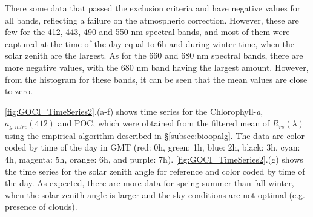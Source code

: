 \documentclass[onecolumn,3p,letterpaper,11pt]{elsarticle}
\begin{document}
There some data that passed the exclusion criteria and have negative values for all bands, reflecting a failure on the atmospheric correction. However, these are few for the 412, 443, 490 and 550 nm spectral bands, and most of them were captured at the time of the day equal to 6h and during winter time, when the solar zenith are the largest. As for the 660 and 680 nm spectral bands, there are more negative values, with the 680 nm band having the largest amount. However, from the histogram for these bands, it can be seen that the mean values are close to zero.

\autoref{fig:GOCI_TimeSeries2}.(a-f) shows time series for the Chlorophyll-{\it a}, $a_{g:mlrc}(412)$ and POC, which were obtained from the filtered mean of $R_{rs}(\lambda)$ using the empirical algorithm described in \S\ref{subsec:bioopalg}.  The data are color coded by time of the day in GMT (red: 0h, green: 1h, blue: 2h, black: 3h, cyan: 4h, magenta: 5h, orange: 6h, and purple: 7h). \autoref{fig:GOCI_TimeSeries2}.(g) shows the time series for the solar zenith angle for reference and color coded by time of the day. As expected, there are more data for spring-summer than fall-winter, when the solar zenith angle is larger and the sky conditions are not optimal (e.g. presence of clouds).
\end{document}
